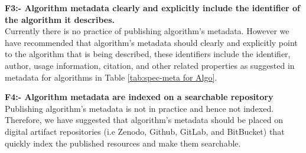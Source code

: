 \documentclass[preprint,12pt]{elsarticle}
\begin{document}
 

\textbf{F3:- Algorithm metadata clearly and explicitly include the identifier of the algorithm it describes.}\\

Currently there is no practice of publishing algorithm's metadata. However we have recommended that algorithm's metadata should clearly and explicitly point to the algorithm that is being described, these identifiers include the identifier, author, usage information, citation, and other related properties as suggested in metadata for algorithms in Table \ref{tab:spec-meta for Algo}. 

\textbf{F4:- Algorithm metadata are indexed on a searchable repository}\\
Publishing algorithm's metadata is not in practice and hence not indexed. Therefore, we have suggested that algorithm's metadata should be placed on digital artifact repositories (i.e Zenodo, Github, GitLab, and BitBucket) that quickly index the published resources and make them searchable.\\
\end{document}
